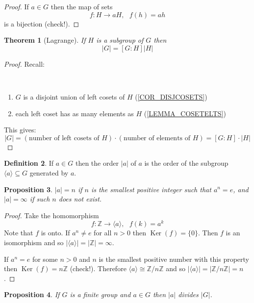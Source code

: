 \documentclass[12pt, letterpaper, oneside]{article}
\theoremstyle{plain}
\newtheorem{theorem}{Theorem}[section]
\newtheorem{proposition}[theorem]{Proposition}
\theoremstyle{definition}
\newtheorem{definition}[theorem]{Definition}
\newcommand{\Z}{{\mathbb Z}}
\newcommand{\Ker}{\operatorname{Ker}}
\newcommand{\subgp}[1]{\langle#1\rangle}
\newcommand{\benu}{\begin{enumerate}}
\newcommand{\eenu}{\end{enumerate}}
\newcommand{\vs}{\vskip 5mm}
\newcommand{\isep}[1][0]{\setlength{\itemsep}{#1 mm}}
\begin{document}
\begin{proof}
If $a\in G$ then the map of sets 
$$f : H \to aH, \ \ \ f(h) = ah$$
is a bijection (check!).
\end{proof}

\vs


\begin{theorem}[Lagrange]
\label{THM_LAGRANGE}
If $H$ is a subgroup of $G$ then 
$$|G| = [G:H]|H|$$
\end{theorem}

\begin{proof}
Recall:\ 

\vskip -13mm

\  
\benu
\isep
\item $G$ is a disjoint union of left cosets of $H$ (\ref{COR_DISJCOSETS}) 
\item each left coset has as many elements as $H$ (\ref{LEMMA_COSETELTS})
\eenu
This gives:
$$|G| = (\text{number of left cosets of $H$})\cdot (\text{number of elements of $H$}) =  [G:H]\cdot |H|$$
\end{proof}

\vs

\begin{definition}
If $a\in G$ then the order $|a|$ of $a$ is the order of the subgroup $\subgp{a}\subseteq G$ generated 
by $a$. 
\end{definition}

\vs 


\begin{proposition}
 $|a|=n$ if $n$ is the smallest positive integer such that $a^{n} = e$, and $|a|=\infty$ if such $n$ 
does not exist. 
\end{proposition}

\vs 

\begin{proof}
Take the homomorphism
$$f\colon \Z \to \subgp{a}, \ \ \ f(k)= a^{k}$$
Note that $f$ is onto. If $a^{n}\neq e$ for all $n>0$ then $\Ker(f) = \{0\}$. Then $f$ is an isomorphism
and so $|\subgp{a}|= |\Z| = \infty$. 

If $a^{n}=e$ for some $n>0$ and $n$ is the smallest positive number with this property then 
$\Ker(f) = n\Z$ (check!). Therefore $\subgp{a}\cong \Z/n\Z$ and so $|\subgp{a}|= |\Z/n\Z| = n$.
 
\end{proof}


\vs 

\begin{proposition}
\label{LEMMA_ORDELTDIVORDGP}
If $G$ is a finite group and $a\in G$ then $|a|$ divides $|G|$.
\end{proposition}
\end{document}
